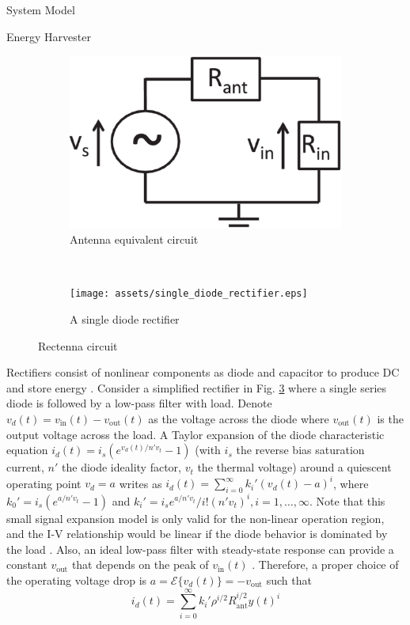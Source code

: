 \documentclass{IEEEtran}
\begin{document}
\begin{section}{System Model}
\begin{subsection}{Energy Harvester}
		\begin{figure}
			\centering
			\begin{subfigure}[t]{0.45\linewidth}
				\centering
				\includegraphics[width=\linewidth]{assets/antenna_equivalent_circuit.eps}
				\caption{Antenna equivalent circuit}
				\label{fi:antenna_equivalent_circuit}
			\end{subfigure}%
			~
			\begin{subfigure}[t]{0.45\linewidth}
				\centering
				\texttt{[image: assets/single\_diode\_rectifier.eps]}
				\caption{A single diode rectifier}
				\label{fi:single_diode_rectifier}
			\end{subfigure}
			\caption{Rectenna circuit}
		\end{figure}

		Rectifiers consist of nonlinear components as diode and capacitor to produce DC and store energy \cite{Hagerty2004,Pinuela2013}. Consider a simplified rectifier in Fig. \ref{fi:single_diode_rectifier} where a single series diode is followed by a low-pass filter with load. Denote $v_d(t)=v_{\text{in}}(t)-v_{\text{out}}(t)$ as the voltage across the diode where $v_{\text{out}}(t)$ is the output voltage across the load. A Taylor expansion of the diode characteristic equation $i_d(t)=i_s(e^{v_d(t)/n' v_t}-1)$ (with $i_s$ the reverse bias saturation current, $n'$ the diode ideality factor, $v_t$ the thermal voltage) around a quiescent operating point $v_d=a$ writes as $i_d(t)=\sum_{i=0}^{\infty}k_i'(v_d(t)-a)^i$, where $k_0'=i_s(e^{a/n' v_t}-1)$ and $k_i'=i_se^{a/n'v_t}/i!(n'v_t)^i,i=1,\dots,\infty$. Note that this small signal expansion model is only valid for the non-linear operation region, and the I-V relationship would be linear if the diode behavior is dominated by the load \cite{Clerckx2016a}. Also, an ideal low-pass filter with steady-state response can provide a constant $v_{\text{out}}$ that depends on the peak of $v_{\text{in}}(t)$ \cite{Curty2005}. Therefore, a proper choice of the operating voltage drop is $a=\mathcal{E}\{v_d(t)\}=-v_{\text{out}}$ such that
		\begin{equation}\label{eq:i_d}
			i_d(t)=\sum_{i=0}^{\infty}k_i'\rho^{i/2}R_{\text{ant}}^{i/2}y(t)^i
		\end{equation}


\end{subsection}
\end{section}
\end{document}
